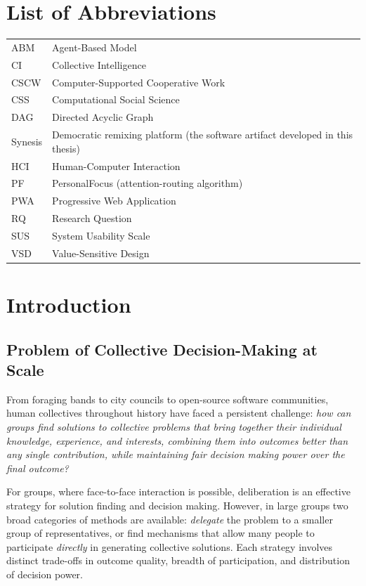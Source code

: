 \documentclass[a4paper, 12pt, twoside]{iviathesis}
\begin{document}
\chapter*{List of Abbreviations}
\begin{tabular}{@{}ll@{}}
ABM  & Agent-Based Model \\
CI   & Collective Intelligence \\
CSCW & Computer-Supported Cooperative Work \\
CSS  & Computational Social Science \\
DAG  & Directed Acyclic Graph \\
Synesis & Democratic remixing platform (the software artifact developed in this thesis) \\
HCI  & Human-Computer Interaction \\
PF   & PersonalFocus (attention-routing algorithm) \\
PWA  & Progressive Web Application \\
RQ   & Research Question \\
SUS  & System Usability Scale \\
VSD  & Value-Sensitive Design \\
\end{tabular}

\tableofcontents
\listoffigures
\listoftables
\markboth{}{}

\mainmatter %

\chapter{Introduction}
\label{ch:introduction}

\section{Problem of Collective Decision-Making at Scale}
\label{sec:problem-statement}

From foraging bands to city councils to open-source software communities, human collectives throughout history have faced a persistent challenge: \textit{how can groups find solutions to collective problems that bring together their individual knowledge, experience, and interests, combining them into outcomes better than any single contribution, while maintaining fair decision making power over the final outcome?} 

For groups, where face-to-face interaction is possible, deliberation is an effective strategy for solution finding and decision making. 
However, in large groups two broad categories of methods are available: \textit{delegate} the problem to a smaller group of representatives, or find mechanisms that allow many people to participate \textit{directly} in generating collective solutions. Each strategy involves distinct trade-offs in outcome quality, breadth of participation, and distribution of decision power.
\end{document}
